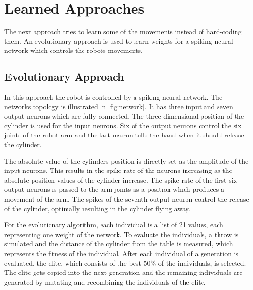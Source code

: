\section{Learned Approaches}
\label{sec:learned}
The next approach tries to learn some of the movements instead of hard-coding them.
An evolutionary approach is used to learn weights for a spiking neural network which controls the robots movements.

\subsection{Evolutionary Approach}
In this approach the robot is controlled by a spiking neural network.
The networks topology is illustrated in \autoref{fig:network}.
It has three input and seven output neurons which are fully connected.
The three dimensional position of the cylinder is used for the input neurons.
Six of the output neurons control the six joints of the robot arm and the last neuron tells the hand when it should release the cylinder.

The absolute value of the cylinders position is directly set as the amplitude of the input neurons.
This results in the spike rate of the neurons increasing as the absolute position values of the cylinder increase.
The spike rate of the first six output neurons is passed to the arm joints as a position which produces a movement of the arm.
The spikes of the seventh output neuron control the release of the cylinder, optimally resulting in the cylinder flying away.

For the evolutionary algorithm, each individual is a list of 21 values, each representing one weight of the network.
To evaluate the individuals, a throw is simulated and the distance of the cylinder from the table is measured, which represents the fitness of the individual.
After each individual of a generation is evaluated, the elite, which consists of the best 50\% of the individuals, is selected.
The elite gets copied into the next generation and the remaining individuals are generated by mutating and recombining the individuals of the elite.

